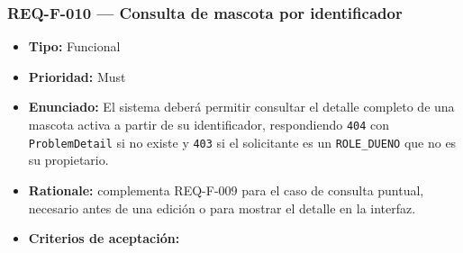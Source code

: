 \documentclass[
  spanish,
]{article}
\providecommand{\tightlist}{%
  \setlength{\itemsep}{0pt}\setlength{\parskip}{0pt}}
\begin{document}
\subsubsection{REQ-F-010 --- Consulta de mascota por
identificador}\label{req-f-010-consulta-de-mascota-por-identificador}

\begin{itemize}
\tightlist
\item
  \textbf{Tipo:} Funcional
\item
  \textbf{Prioridad:} Must
\item
  \textbf{Enunciado:} El sistema deberá permitir consultar el detalle
  completo de una mascota activa a partir de su identificador,
  respondiendo \texttt{404} con \texttt{Problem\allowbreak{}Detail} si no existe y
  \texttt{403} si el solicitante es un \texttt{ROLE\_\allowbreak{}DUENO} que no es su
  propietario.
\item
  \textbf{Rationale:} complementa REQ-F-009 para el caso de consulta
  puntual, necesario antes de una edición o para mostrar el detalle en
  la interfaz.
\item
  \textbf{Criterios de aceptación:}


\end{itemize}
\end{document}
